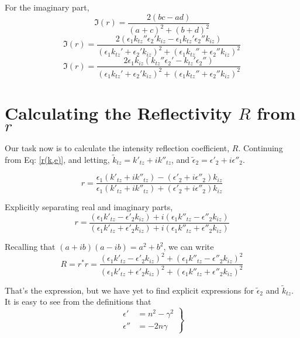 \documentclass[10pt,a4paper]{article}
\begin{document}
For the imaginary part,
\begin{equation}
\Im(r)=\frac{2(bc-ad)}{(a+c)^2+(b+d)^2}
\end{equation}
\begin{equation}
\Im(r)=\frac{2(\epsilon_1k_{tz}''\epsilon_2'k_{iz}-\epsilon_1k_{tz}'\epsilon_2''k_{iz})}{(\epsilon_1k_{tz}'+\epsilon_2'k_{iz})^2+(\epsilon_1k_{tz}''+\epsilon_2''k_{iz})^2}
\end{equation}
\begin{equation}\boxed{
\Im(r)=\frac{2\epsilon_1k_{iz}(k_{tz}''\epsilon_2'-k_{tz}'\epsilon_2'')}{(\epsilon_1k_{tz}'+\epsilon_2'k_{iz})^2+(\epsilon_1k_{tz}''+\epsilon_2''k_{iz})^2}
}\end{equation}


\section{Calculating the Reflectivity $R$ from $r$}
Our task now is to calculate the intensity reflection coefficient, $R$. Continuing from Eq: \ref{r(k,e)}, and letting, $\tilde{k}_{tz}=k'_{tz}+ik''_{tz}$, and $\tilde{\epsilon}_2=\epsilon'_2+i\epsilon''_2$.

\begin{equation}
r=\frac{
\epsilon_1(k'_{tz}+ik''_{tz})-(\epsilon'_2+i\epsilon''_2)k_{iz}
}{
\epsilon_1(k'_{tz}+ik''_{tz})+(\epsilon'_2+i\epsilon''_2)k_{iz}
}
\end{equation}

Explicitly separating real and imaginary parts,
\begin{equation}
r=\frac{
(\epsilon_1 k'_{tz}-\epsilon'_2k_{iz}) +i (\epsilon_1 k''_{tz}-\epsilon''_2k_{iz})
}{
(\epsilon_1 k'_{tz}+\epsilon'_2k_{iz}) +i (\epsilon_1 k''_{tz}+\epsilon''_2k_{iz})
}
\end{equation}

Recalling that $(a+ib)(a-ib)=a^2+b^2$, we can write
\begin{equation}
R=r^*r=\frac{
(\epsilon_1 k'_{tz}-\epsilon'_2 k_{iz})^2 + (\epsilon_1 k''_{tz}-\epsilon''_2 k_{iz})^2
}{
(\epsilon_1 k'_{tz}+\epsilon'_2 k_{iz})^2 + (\epsilon_1 k''_{tz}+\epsilon''_2 k_{iz})^2
}
\end{equation}

That's the expression, but we have yet to find explicit expressions for $\tilde{\epsilon}_2$ and $\tilde{k}_{tz}$.  It is easy to see from the definitions that
\begin{equation}
\left.
\begin{aligned}
\epsilon'&=n^2-\gamma^2 \\
\epsilon''&=-2n\gamma
\end{aligned}
\right\}
\end{equation}
\end{document}
